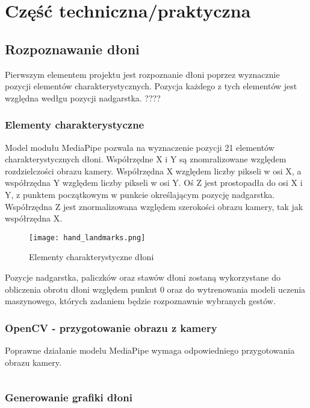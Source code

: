\chapter{Część techniczna/praktyczna}
\section{Rozpoznawanie dłoni}

\quad Pierwszym elementem projektu jest rozpoznanie dłoni poprzez wyznacznie pozycji elementów charakterystycznych. Pozycja każdego z tych elementów jest względna wedłgu pozycji nadgarstka. ????



\subsection{Elementy charakterystyczne}

\quad Model modułu MediaPipe pozwala na wyznaczenie pozycji 21 elementów charakterystycznych dłoni. Współrzędne X i Y są znomralizowane względem rozdzielczości obrazu kamery. Współrzędna X względem liczby pikseli w osi X, a współrzędna Y względem liczby pikseli w osi Y. Oś Z jest prostopadła do osi X i Y, z punktem początkowym w punkcie określającym pozycję nadgarstka. Współrzędna Z jest znormalizowana względem szerokości obrazu kamery, tak jak współrzędna X. 

\begin{figure}[H]
\begin{center}
    \texttt{[image: hand\_landmarks.png]}
    \caption{Elementy charakterystyczne dłoni}
\end{center}
\end{figure}

\quad Pozycje nadgarstka, paliczków oraz stawów dłoni zostaną wykorzystane do obliczenia obrotu dłoni względem punkut 0 oraz do wytrenowania modeli uczenia maszynowego, których zadaniem będzie rozpoznawnie wybranych gestów. 

\subsection{OpenCV - przygotowanie obrazu z kamery}

\quad Poprawne działanie modelu MediaPipe wymaga odpowiedniego przygotowania obrazu kamery. 

\inputminted[firstline=272, lastline=297]{python}{../OpenLeap.py}

\subsection{Generowanie grafiki dłoni}

